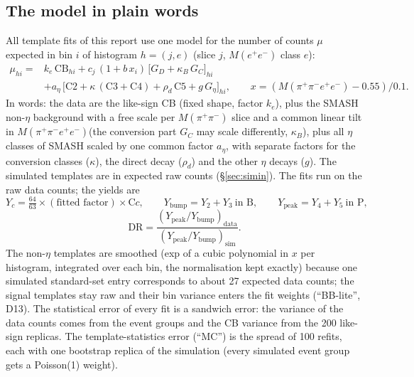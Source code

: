 \documentclass[11pt,a4paper]{article}
\newcommand{\Mfour}{\ensuremath{M(\pi^{+}\pi^{-}e^{+}e^{-})}\xspace}
\newcommand{\Mee}{\ensuremath{M(e^{+}e^{-})}\xspace}
\newcommand{\Mpipi}{\ensuremath{M(\pi^{+}\pi^{-})}\xspace}
\newcommand{\aEta}{\ensuremath{a_\eta}\xspace}
\newcommand{\kB}{\ensuremath{\kappa_B}\xspace}
\newcommand{\rhod}{\ensuremath{\rho_d}\xspace}
\begin{document}
\subsection{The model in plain words}
\label{sec:model}
All template fits of this report use one model for the number of counts $\mu$ expected in bin $i$ of histogram $h=(j,e)$
(slice $j$, \Mee class $e$):
\begin{align}
\mu_{hi}={}&k_e\,\mathrm{CB}_{hi}+c_j\,(1+b\,x_i)\,\big[G_D+\kappa_B\,G_C\big]_{hi}\nonumber\\
&+a_\eta\,\big[\mathrm{C2}+\kappa\,(\mathrm{C3}+\mathrm{C4})+\rho_d\,\mathrm{C5}+g\,G_\eta\big]_{hi},\qquad x=(\Mfour-0.55)/0.1.
\label{eq:model}
\end{align}
In words: the data are the like-sign CB (fixed shape, factor $k_e$), plus the SMASH non-$\eta$ background with a free scale per
\Mpipi slice and a common linear tilt in \Mfour (the conversion part $G_C$ may scale differently, \kB), plus all $\eta$ classes
of SMASH scaled by one common factor \aEta, with separate factors for the conversion classes ($\kappa$), the direct decay
(\rhod) and the other $\eta$ decays ($g$). The simulated templates are in expected raw counts (\S\ref{sec:simin}). The fits run on the raw
data counts; the yields are
\begin{equation}
Y_c=\tfrac{64}{63}\times(\text{fitted factor})\times\mathrm{C}c,\qquad Y_{\mathrm{bump}}=Y_2+Y_3\ \text{in B},\qquad Y_{\mathrm{peak}}=Y_4+Y_5\ \text{in P},
\label{eq:yields}
\end{equation}
\[
\mathrm{DR}=\frac{(Y_{\mathrm{peak}}/Y_{\mathrm{bump}})_{\mathrm{data}}}{(Y_{\mathrm{peak}}/Y_{\mathrm{bump}})_{\mathrm{sim}}}.
\]
The non-$\eta$ templates are smoothed (exp of a cubic polynomial in $x$ per histogram, integrated over each bin, the normalisation kept
exactly) because one simulated standard-set entry corresponds to about 27 expected data counts; the signal templates stay raw and their bin
variance enters the fit weights (``BB-lite'', D13). The statistical error of every fit is a sandwich error: the variance of the data
counts comes from the event groups and the CB variance from the 200 like-sign replicas. The template-statistics error (``MC'') is the
spread of 100 refits, each with one bootstrap replica of the simulation (every simulated event group gets a Poisson(1) weight).
\end{document}
